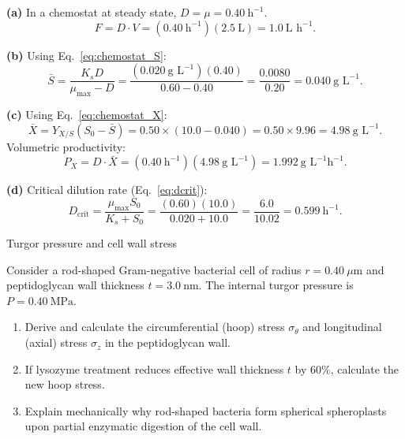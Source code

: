\documentclass[12pt, a4paper, oneside]{report}
\begin{document}
\begin{solution}
  \textbf{(a)} In a chemostat at steady state, $D = \mu = 0.40~\text{h}^{-1}$.
  \[
    F = D \cdot V = (0.40~\text{h}^{-1})(2.5~\text{L}) = 1.0~\text{L~h}^{-1}.
  \]

  \textbf{(b)} Using Eq.~\eqref{eq:chemostat_S}:
  \[
    \bar{S} = \frac{K_s D}{\mu_{\max} - D} = \frac{(0.020~\text{g~L}^{-1})(0.40)}{0.60 - 0.40} = \frac{0.0080}{0.20} = 0.040~\text{g~L}^{-1}.
  \]

  \textbf{(c)} Using Eq.~\eqref{eq:chemostat_X}:
  \[
    \bar{X} = Y_{X/S}(S_0 - \bar{S}) = 0.50 \times (10.0 - 0.040) = 0.50 \times 9.96 = 4.98~\text{g~L}^{-1}.
  \]
  Volumetric productivity:
  \[
    P_X = D \cdot \bar{X} = (0.40~\text{h}^{-1})(4.98~\text{g~L}^{-1}) = 1.992~\text{g~L}^{-1}\text{h}^{-1}.
  \]

  \textbf{(d)} Critical dilution rate (Eq.~\ref{eq:dcrit}):
  \[
    D_{\text{crit}} = \frac{\mu_{\max} S_0}{K_s + S_0} = \frac{(0.60)(10.0)}{0.020 + 10.0} = \frac{6.0}{10.02} = 0.599~\text{h}^{-1}.
  \]
\end{solution}

\begin{problem}{\enspace{}\enspace
  Turgor pressure and cell wall stress}

  Consider a rod-shaped Gram-negative bacterial cell of radius $r = 0.40~\mu\text{m}$ and peptidoglycan wall thickness $t = 3.0~\text{nm}$. The internal turgor pressure is $P = 0.40~\text{MPa}$.

  \begin{enumerate}
    \item Derive and calculate the circumferential (hoop) stress $\sigma_\theta$ and longitudinal (axial) stress $\sigma_z$ in the peptidoglycan wall.
    \item If lysozyme treatment reduces effective wall thickness $t$ by $60\%$, calculate the new hoop stress.
    \item Explain mechanically why rod-shaped bacteria form spherical spheroplasts upon partial enzymatic digestion of the cell wall.
  \end{enumerate}
\end{problem}
\end{document}
